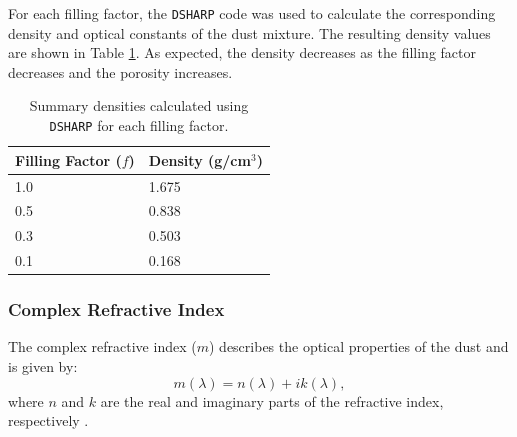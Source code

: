 For each filling factor, the \texttt{DSHARP} code was used to calculate the corresponding density and optical constants of the dust mixture. The resulting density values are shown in Table \ref{tab:dsharp_density}. As expected, the density decreases as the filling factor decreases and the porosity increases.  



\begin{table}[h!]
\centering
\caption{Summary densities calculated using \texttt{DSHARP} for each filling factor.}
\begin{tabular}{ll}
\toprule
\textbf{Filling Factor (\boldmath$f$)} &
\textbf{Density (g/cm\boldmath$^3$)} \\
\midrule
1.0    & 1.675 \\
0.5 & 0.838 \\
0.3  & 0.503 \\
0.1 & 0.168 \\
\bottomrule
\end{tabular}
\label{tab:dsharp_density}
\end{table}








\subsubsection{Complex Refractive Index}
The complex refractive index ($m$) describes the optical properties of the dust and is given by:
\begin{equation}
 m(\lambda) = n(\lambda) + ik(\lambda),
\end{equation}
\noindent where $n$ and $k$ are the real and imaginary parts of the refractive index, respectively \citep{Zhang2023}. 


